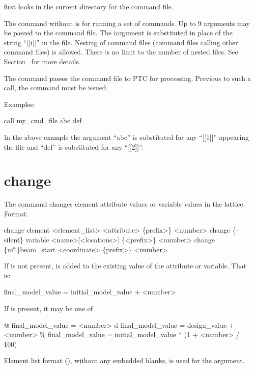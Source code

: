 \vskip 0.2in 
\tao first looks in the current directory for the command file.

The  command without  is for running a set of \tao
commands.  Up to 9 arguments may be passed to the command file. The
i\Th argument is substituted in place of the string ``[[i]]'' in the
file. Nesting of command files (command files calling other command
files) is allowed. There is no limit to the number of nested files.
See Section~ for more details.

The  command passes the command file to PTC for
processing. Previous to such a call, the command 
must be issued.

Examples:
\begin{example}
    call my_cmd_file abc def 
\end{example}
In the above example the argument ``abc'' is substituted for any
``[[1]]'' appearing the file and ``def'' is substituted for any
``[[2]]''.
\Newline

\section{change}
\label{s:change}

The  command changes element attribute values or variable
values in the  lattice. Format:
\begin{example}
  change element <element_list> <attribute> \{prefix>\} <number>
  change \{-silent\} variable <name>[<locations>] \{<prefix>\} <number>
  change  \{n@\}beam_start <coordinate> \{prefix>\} <number>
\end{example}

\vskip 0.2in 
If  is not present,  is added
to the existing value of the attribute or variable. That is:
\begin{example}
  final_model_value = initial_model_value + <number>
\end{example}
If  is present, it may be one of
\begin{example}
  @       final_model_value = <number>
  d       final_model_value = design_value + <number>
  \%       final_model_value = initial_model_value * (1 + <number> / 100)
\end{example}

Element list format (), without any embedded
blanks, is used for the  argument.

